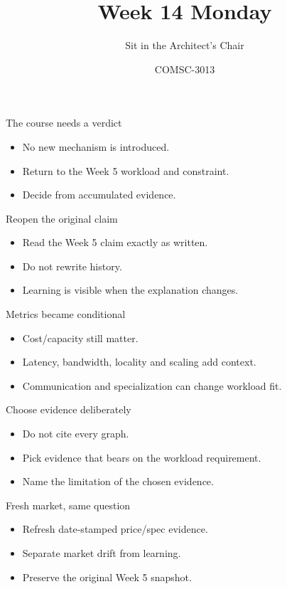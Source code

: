 \documentclass{beamer}
\title{Week 14 Monday}\subtitle{Sit in the Architect's Chair}\author{COMSC-3013}\date{}
\begin{document}
\begin{frame}\titlepage\end{frame}
\begin{frame}{The course needs a verdict}\begin{itemize}\item No new mechanism is introduced.\item Return to the Week 5 workload and constraint.\item Decide from accumulated evidence.\end{itemize}\end{frame}
\begin{frame}{Reopen the original claim}\begin{itemize}\item Read the Week 5 claim exactly as written.\item Do not rewrite history.\item Learning is visible when the explanation changes.\end{itemize}\end{frame}
\begin{frame}{Metrics became conditional}\begin{itemize}\item Cost/capacity still matter.\item Latency, bandwidth, locality and scaling add context.\item Communication and specialization can change workload fit.\end{itemize}\end{frame}
\begin{frame}{Choose evidence deliberately}\begin{itemize}\item Do not cite every graph.\item Pick evidence that bears on the workload requirement.\item Name the limitation of the chosen evidence.\end{itemize}\end{frame}
\begin{frame}{Fresh market, same question}\begin{itemize}\item Refresh date-stamped price/spec evidence.\item Separate market drift from learning.\item Preserve the original Week 5 snapshot.\end{itemize}\end{frame}
\end{document}

